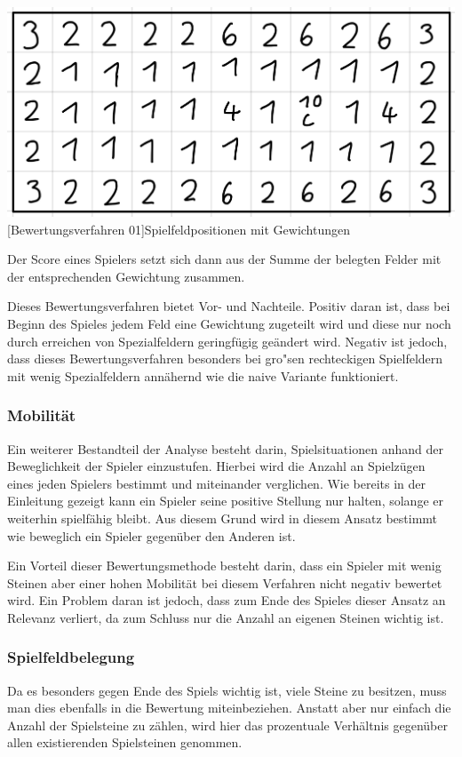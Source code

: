 \vspace{1em}
\begin{minipage}{\linewidth}
    \centering
    \includegraphics[width=0.5\linewidth]{pics/rating}
    [Bewertungsverfahren 01]{Spielfeldpositionen mit Gewichtungen}
    \label{fig:bewertungsverfahren01}
\end{minipage}

Der Score eines Spielers setzt sich dann aus der Summe der belegten Felder mit der entsprechenden Gewichtung zusammen.

Dieses Bewertungsverfahren bietet Vor- und Nachteile.
Positiv daran ist, dass bei Beginn des Spieles jedem Feld eine Gewichtung zugeteilt wird und diese nur noch durch erreichen von Spezialfeldern geringf\"ugig ge\"andert wird.
Negativ ist jedoch, dass dieses Bewertungsverfahren besonders bei gro"sen rechteckigen Spielfeldern mit wenig Spezialfeldern ann\"ahernd wie die naive Variante funktioniert.

\subsubsection{Mobilit\"at}
Ein weiterer Bestandteil der Analyse besteht darin, Spielsituationen anhand der Beweglichkeit der Spieler einzustufen.
Hierbei wird die Anzahl an Spielz\"ugen eines jeden Spielers bestimmt und miteinander verglichen.
Wie bereits in der Einleitung gezeigt kann ein Spieler seine positive Stellung nur halten, solange er weiterhin spielf\"ahig bleibt.
Aus diesem Grund wird in diesem Ansatz bestimmt wie beweglich ein Spieler gegen\"uber den Anderen ist.

Ein Vorteil dieser Bewertungsmethode besteht darin, dass ein Spieler mit wenig Steinen aber einer hohen Mobilit\"at bei diesem Verfahren nicht negativ bewertet wird.
Ein Problem daran ist jedoch, dass zum Ende des Spieles dieser Ansatz an Relevanz verliert, da zum Schluss nur die Anzahl an eigenen Steinen wichtig ist.

\subsubsection{Spielfeldbelegung}
Da es besonders gegen Ende des Spiels wichtig ist, viele Steine zu besitzen, muss man dies ebenfalls in die Bewertung miteinbeziehen.
Anstatt aber nur einfach die Anzahl der Spielsteine zu z\"ahlen, wird hier das prozentuale Verh\"altnis gegen\"uber allen existierenden Spielsteinen genommen.

